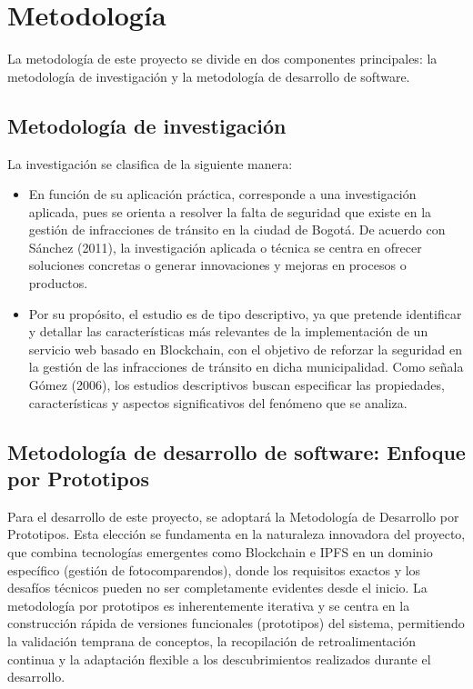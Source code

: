\section{Metodología}
La metodología de este proyecto se divide en dos componentes principales: la metodología de investigación y la metodología de desarrollo de software.  

\subsection{Metodología de investigación}
La investigación se clasifica de la siguiente manera:
\begin{itemize}
  \item En función de su aplicación práctica, corresponde a una investigación aplicada, pues se orienta a resolver la falta de seguridad que existe en la gestión de infracciones de tránsito en la ciudad de Bogotá. De acuerdo con Sánchez (2011), la investigación aplicada o técnica se centra en ofrecer soluciones concretas o generar innovaciones y mejoras en procesos o productos.
  \item Por su propósito, el estudio es de tipo descriptivo, ya que pretende identificar y detallar las características más relevantes de la implementación de un servicio web basado en Blockchain, con el objetivo de reforzar la seguridad en la gestión de las infracciones de tránsito en dicha municipalidad. Como señala Gómez (2006), los estudios descriptivos buscan especificar las propiedades, características y aspectos significativos del fenómeno que se analiza.
\end{itemize}
\subsection{Metodología de desarrollo de software: Enfoque por Prototipos}
Para el desarrollo de este proyecto, se adoptará la Metodología de Desarrollo por Prototipos. Esta elección se fundamenta en la naturaleza innovadora del proyecto, que combina tecnologías emergentes como Blockchain e IPFS en un dominio específico (gestión de fotocomparendos), donde los requisitos exactos y los desafíos técnicos pueden no ser completamente evidentes desde el inicio. La metodología por prototipos es inherentemente iterativa y se centra en la construcción rápida de versiones funcionales (prototipos) del sistema, permitiendo la validación temprana de conceptos, la recopilación de retroalimentación continua y la adaptación flexible a los descubrimientos realizados durante el desarrollo. 